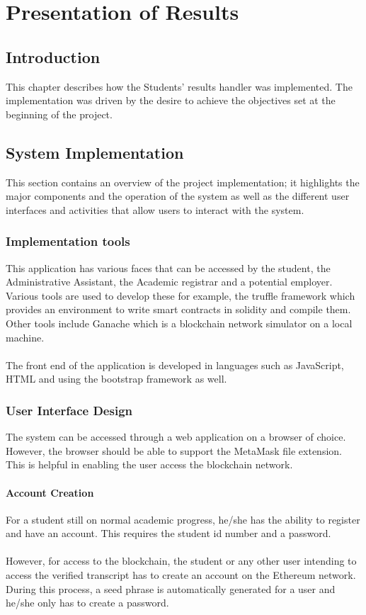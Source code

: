 \chapter{Presentation of Results}
\section{Introduction}
This chapter describes how the Students’ results handler was implemented. The implementation was driven by the desire to achieve the objectives set at the beginning of the project.

\section{System Implementation}
This section contains an overview of the project implementation; it highlights the major components and the operation of the system as well as the different user interfaces and activities that allow users to interact with the system.

\subsection{Implementation tools}
This application has various faces that can be accessed by the student, the Administrative Assistant, the Academic registrar and a potential employer. Various tools are used to develop these for example, the truffle framework which provides an environment to write smart contracts in solidity and compile them. Other tools include Ganache\cite{art14} which is a blockchain network simulator on a local machine.\\~\\
The front end of the application is developed in languages such as JavaScript, HTML and using the bootstrap framework as well.

\subsection{User Interface Design}
The system can be accessed through a web application on a browser of choice. However, the browser should be able to support the MetaMask file extension. This is helpful in enabling the user access the blockchain network.

\subsubsection{Account Creation}
For a student still on normal academic progress, he/she has the ability to register and have an account. This requires the student id number and a password. \\~\\
However, for access to the blockchain, the student or any other user intending to access the verified transcript has to create an account on the Ethereum\cite{art13} network. During this process, a seed phrase is automatically generated for a user and he/she only has to create a password.

